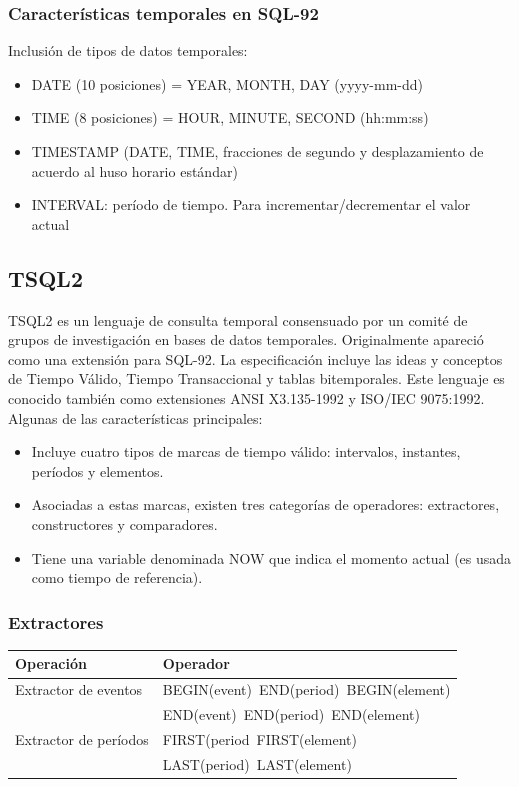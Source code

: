 \documentclass[a4paper,12pt,oneside]{report}
\begin{document}
\subsubsection*{Caracter\'isticas temporales en SQL-92}
Inclusi\'on de tipos de datos temporales:
\begin{itemize}
\item DATE (10 posiciones) = YEAR, MONTH, DAY (yyyy-mm-dd)
\item TIME (8 posiciones) = HOUR, MINUTE, SECOND (hh:mm:ss)
\item TIMESTAMP (DATE, TIME, fracciones de segundo y desplazamiento de acuerdo al huso horario est\'andar)
\item INTERVAL: per\'iodo de tiempo. Para incrementar/decrementar el valor actual
\end{itemize}
\subsection*{TSQL2}
TSQL2 \cite{tsql2} es un lenguaje de consulta temporal consensuado por un comit\'e de grupos de investigaci\'on en bases de datos temporales. Originalmente apareci\'o como una extensi\'on para SQL-92. La especificaci\'on incluye las ideas y conceptos de Tiempo V\'alido, Tiempo Transaccional y tablas bitemporales. Este lenguaje es conocido tambi\'en como extensiones ANSI X3.135-1992 y ISO/IEC 9075:1992.\\
Algunas de las caracter\'isticas principales:
\begin{itemize}
\item Incluye cuatro tipos de marcas de tiempo v\'alido: intervalos, instantes, per\'iodos y elementos.
\item Asociadas a estas marcas, existen tres categor\'ias de operadores: extractores, constructores y comparadores.
\item Tiene una variable denominada NOW que indica el momento actual (es usada como tiempo de referencia).
\end{itemize}
\subsubsection*{Extractores}
\begin{center}
\begin{tabular}{|l|l|}
\hline
Operaci\'on & Operador\\
\hline
\hline
Extractor de eventos & BEGIN(event)\ END(period)\ BEGIN(element)\\
& END(event)\ END(period)\ END(element)\\
\hline
Extractor de per\'iodos & FIRST(period\ FIRST(element)\\
& LAST(period)\ LAST(element)\\
\hline
\end{tabular}
\end{center}
\end{document}
